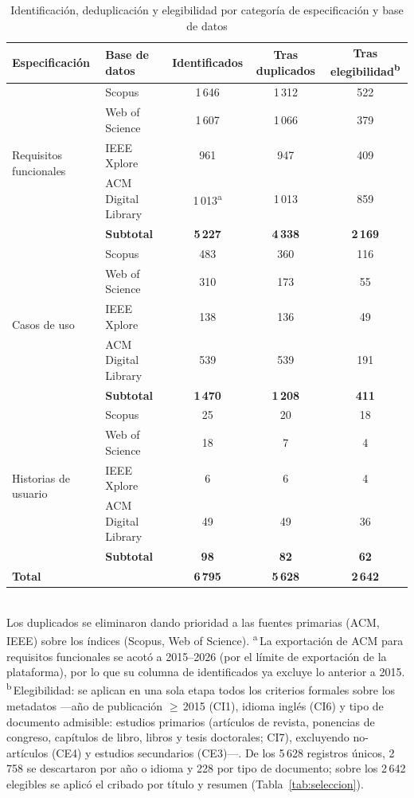 \documentclass[10pt,journal,twoside,letterpaper]{IEEEtran}
\begin{document}
	\begin{table}[!tb]
		\caption{Identificación, deduplicación y elegibilidad por categoría de especificación y base de datos}
		\label{tab:distrib}
		\centering
		\small
		\setlength{\tabcolsep}{6pt}
		\begin{tabular}{@{}llccc@{}}
			\toprule
			\textbf{Especificación} & \textbf{Base de datos} & \textbf{Identificados} & \textbf{Tras duplicados} & \textbf{Tras elegibilidad\textsuperscript{b}} \\
			\midrule
			\multirow{5}{*}{Requisitos funcionales} & Scopus & 1\,646 & 1\,312 & 522 \\
			 & Web of Science      & 1\,607 & 1\,066 & 379 \\
			 & IEEE Xplore         & 961    & 947    & 409 \\
			 & ACM Digital Library & 1\,013\textsuperscript{a} & 1\,013 & 859 \\
			\cmidrule(l){2-5}
			 & \textbf{Subtotal}   & \textbf{5\,227} & \textbf{4\,338} & \textbf{2\,169} \\
			\midrule
			\multirow{5}{*}{Casos de uso} & Scopus & 483 & 360 & 116 \\
			 & Web of Science      & 310 & 173 & 55 \\
			 & IEEE Xplore         & 138 & 136 & 49 \\
			 & ACM Digital Library & 539 & 539 & 191 \\
			\cmidrule(l){2-5}
			 & \textbf{Subtotal}   & \textbf{1\,470} & \textbf{1\,208} & \textbf{411} \\
			\midrule
			\multirow{5}{*}{Historias de usuario} & Scopus & 25 & 20 & 18 \\
			 & Web of Science      & 18 & 7 & 4 \\
			 & IEEE Xplore         & 6 & 6 & 4 \\
			 & ACM Digital Library & 49 & 49 & 36 \\
			\cmidrule(l){2-5}
			 & \textbf{Subtotal}   & \textbf{98} & \textbf{82} & \textbf{62} \\
			\midrule
			\textbf{Total} & & \textbf{6\,795} & \textbf{5\,628} & \textbf{2\,642} \\
			\bottomrule
		\end{tabular}
		\\[3pt]
		{\footnotesize Los duplicados se eliminaron dando prioridad a las fuentes primarias (ACM, IEEE) sobre los índices (Scopus, Web of Science). \textsuperscript{a}\,La exportación de ACM para requisitos funcionales se acotó a 2015--2026 (por el límite de exportación de la plataforma), por lo que su columna de identificados ya excluye lo anterior a 2015. \textsuperscript{b}\,Elegibilidad: se aplican en una sola etapa todos los criterios formales sobre los metadatos ---año de publicación $\geq$\,2015 (CI1), idioma inglés (CI6) y tipo de documento admisible: estudios primarios (artículos de revista, ponencias de congreso, capítulos de libro, libros y tesis doctorales; CI7), excluyendo no-artículos (CE4) y estudios secundarios (CE3)---. De los 5\,628 registros únicos, 2\,758 se descartaron por año o idioma y 228 por tipo de documento; sobre los 2\,642 elegibles se aplicó el cribado por título y resumen (Tabla~\ref{tab:seleccion}).}
	\end{table}
\end{document}

